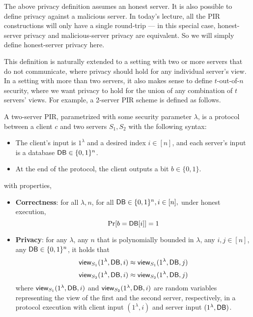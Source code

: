 \begin{remark}
The above privacy definition assumes an honest server.
It is also possible to define privacy against a malicious server.
In today's lecture, all the PIR constructions
will only have a single round-trip --- 
in this special case, honest-server privacy
and malicious-server
privacy are equivalent. So we will simply define honest-server privacy here.
\end{remark}



This definition is naturally extended to 
a setting with two or more servers that do not communicate, 
where privacy should hold for any individual server's view. 
In a setting with more than two servers, it also makes
sense to define $t$-out-of-$n$ security, where
we want privacy to hold for 
the union of any combination of $t$ 
servers' views.
For example, a 2-server PIR scheme is defined as follows. 



\begin{definition}
A two-server PIR, parametrized with some security parameter $\lambda$, is a 
protocol between a client $c$ and two servers $S_{1},S_{2}$ 
with the following syntax:  
\begin{itemize}
	\item 
The client's input is $1^\lambda$ and a 
desired index $i \in [n]$, and 
each server's input is a database ${\sf DB} \in \{0,1\}^n$.
	\item At the end of the protocol, 
the client outputs a bit $b \in \{0,1\}$.
\end{itemize}
with properties,
\begin{itemize}
	\item \textbf{Correctness}: for all $\lambda, n$, for 
all ${\sf DB} \in \{0,1\}^n, i \in [n],$ under honest execution, 
	\[\Pr[b = \DB[i]] = 1%
\]
\item \textbf{Privacy}: 
for any $\lambda$, any $n$ that is polynomially bounded in $\lambda$,
any $i,j \in [n]$, any ${\sf DB}  \in \{0,1\}^n$, it holds that 
	\[{\sf view}_{S_{1}}(1^\lambda,{\sf DB},i) \approx {\sf view}_{S_{1}}(1^\lambda,{\sf DB},j)\]
	\[{\sf view}_{S_{2}}(1^\lambda,{\sf DB},i) \approx {\sf view}_{S_{2}}(1^\lambda,{\sf DB},j)\]
where ${\sf view}_{S_{1}}(1^\lambda, {\sf DB}, i)$
and ${\sf view}_{S_{2}}(1^\lambda, {\sf DB}, i)$
are random variables representing the 
view of the first and the second server, respectively, in a protocol
execution 
with client input $(1^\lambda, i)$
and server input $(1^\lambda, {\sf DB})$.
\end{itemize}
\end{definition}


